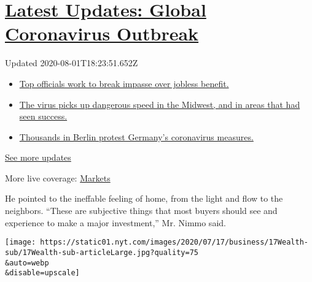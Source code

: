 \hypertarget{latest-updates-global-coronavirus-outbreak}{%
\section{\texorpdfstring{\href{https://www.nytimes.com/2020/08/01/world/coronavirus-covid-19.html?action=click\&pgtype=Article\&state=default\&region=MAIN_CONTENT_1\&context=storylines_live_updates}{Latest
Updates: Global Coronavirus
Outbreak}}{Latest Updates: Global Coronavirus Outbreak}}\label{latest-updates-global-coronavirus-outbreak}}

Updated 2020-08-01T18:23:51.652Z

\begin{itemize}
\tightlist
\item
  \href{https://www.nytimes.com/2020/08/01/world/coronavirus-covid-19.html?action=click\&pgtype=Article\&state=default\&region=MAIN_CONTENT_1\&context=storylines_live_updates\#link-3ac56579}{Top
  officials work to break impasse over jobless benefit.}
\item
  \href{https://www.nytimes.com/2020/08/01/world/coronavirus-covid-19.html?action=click\&pgtype=Article\&state=default\&region=MAIN_CONTENT_1\&context=storylines_live_updates\#link-8796723}{The
  virus picks up dangerous speed in the Midwest, and in areas that had
  seen success.}
\item
  \href{https://www.nytimes.com/2020/08/01/world/coronavirus-covid-19.html?action=click\&pgtype=Article\&state=default\&region=MAIN_CONTENT_1\&context=storylines_live_updates\#link-25930521}{Thousands
  in Berlin protest Germany's coronavirus measures.}
\end{itemize}

\href{https://www.nytimes.com/2020/08/01/world/coronavirus-covid-19.html?action=click\&pgtype=Article\&state=default\&region=MAIN_CONTENT_1\&context=storylines_live_updates}{See
more updates}

More live coverage:
\href{https://www.nytimes.com/live/2020/07/31/business/stock-market-today-coronavirus?action=click\&pgtype=Article\&state=default\&region=MAIN_CONTENT_1\&context=storylines_live_updates}{Markets}

He pointed to the ineffable feeling of home, from the light and flow to
the neighbors. ``These are subjective things that most buyers should see
and experience to make a major investment,'' Mr. Nimmo said.

\texttt{[image: https://static01.nyt.com/images/2020/07/17/business/17Wealth-sub/17Wealth-sub-articleLarge.jpg?quality=75\\\&auto=webp\\\&disable=upscale]}

